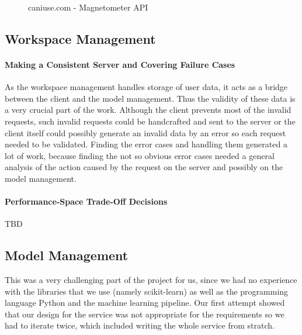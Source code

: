 \begin{figure}[ht]
    \centering
    \caption{caniuse.com - Magnetometer API}
\end{figure}
\newpage
\subsection{Workspace Management}
\paragraph{Making a Consistent Server and Covering Failure Cases}
As the workspace management handles storage of user data, it acts as a bridge between the client and the model management. Thus the validity of these data is a very crucial part of the work. Although the client prevents most of the invalid requests, such invalid requests could be handcrafted and sent to the server or the client itself could possibly generate an invalid data by an error so each request needed to be validated. Finding the error cases and handling them generated a lot of work, because finding the not so obvious error cases needed a general analysis of the action caused by the request on the server and possibly on the model management.
\paragraph{Performance-Space Trade-Off Decisions}
TBD
\newpage
\subsection{Model Management}
This was a very challenging part of the project for us, since we had no 
experience with the libraries that we use (namely scikit-learn) as well
as the programming language Python and the machine learning pipeline. Our first
attempt showed that our design for the service was not appropriate for the requirements
so we had to iterate twice, which included writing the whole service from
stratch.

